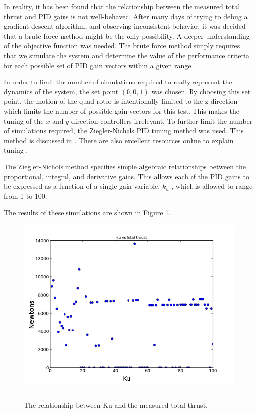 In reality, it has been found that the relationship between the measured total thrust and PID gains is not well-behaved. After many days of trying to debug a gradient descent algorithm, and observing inconsistent behavior, it was decided that a brute force method might be the only possibility. A deeper understanding of the objective function was needed. The brute force method simply requires that we simulate the system and determine the value of the performance criteria for each possible set of PID gain vectors within a given range.

In order to limit the number of simulations required to really represent the dynamics of the system, the set point $(0,0,1)$ was chosen. By choosing this set point, the motion of the quad-rotor is intentionally limited to the z-direction which limits the number of possible gain vectors for this test. This makes the tuning of the $x$ and $y$ direction controllers irrelevant. To further limit the number of simulations required, the Ziegler-Nichols PID tuning method was used. This method is discussed in \cite{ziegler1942optimum}. There are also excellent resources online to explain tuning \cite{znw:2014:Online}.

The Ziegler-Nichols method specifies simple algebraic relationships between the proportional, integral, and derivative gains. This allows each of the PID gains to be expressed as a function of a single gain variable, $k_u$ , which is allowed to range from 1 to 100.

 The results of these simulations are shown in Figure \ref{fig:Ku vs Thrust}.
\begin{figure}[htbp]
	\centering
		\includegraphics{Figures/kuvsthrust.png}
		\rule{35em}{0.5pt}
	\caption[The relationship between Ku and the measured total thrust.]{The relationship between Ku and the measured total thrust.}
	\label{fig:Ku vs Thrust}
\end{figure}

